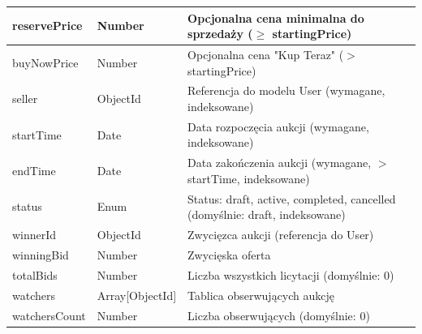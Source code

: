 \begin{longtable}{|p{3.5cm}|p{2.5cm}|p{8cm}|}
  reservePrice  & Number          & Opcjonalna cena minimalna do sprzedaży ($\geq$ startingPrice)                                                                                                 \\ \hline
  buyNowPrice   & Number          & Opcjonalna cena "Kup Teraz" ($>$ startingPrice)                                                                                                               \\ \hline
  seller        & ObjectId        & Referencja do modelu User (wymagane, indeksowane)                                                                                                             \\ \hline
  startTime     & Date            & Data rozpoczęcia aukcji (wymagane, indeksowane)                                                                                                               \\ \hline
  endTime       & Date            & Data zakończenia aukcji (wymagane, $>$ startTime, indeksowane)                                                                                                \\ \hline
  status        & Enum            & Status: draft, active, completed, cancelled (domyślnie: draft, indeksowane)                                                                                   \\ \hline
  winnerId      & ObjectId        & Zwycięzca aukcji (referencja do User)                                                                                                                         \\ \hline
  winningBid    & Number          & Zwycięska oferta                                                                                                                                              \\ \hline
  totalBids     & Number          & Liczba wszystkich licytacji (domyślnie: 0)                                                                                                                    \\ \hline
  watchers      & Array[ObjectId] & Tablica obserwujących aukcję                                                                                                                                  \\ \hline
  watchersCount & Number          & Liczba obserwujących (domyślnie: 0)                                                                                                                           \\ \hline

\end{longtable}
